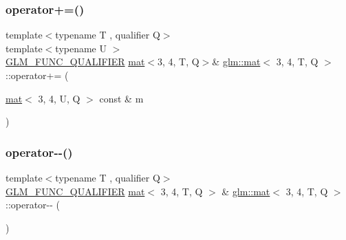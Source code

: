 \mbox{\label{structglm_1_1mat_3_013_00_014_00_01_t_00_01_q_01_4_a34254ab9a3f60274b681b3a1c0a3bf67}} 
\subsubsection{\texorpdfstring{operator+=()}{operator+=()}\hspace{0.1cm}{\footnotesize\ttfamily [4/4]}}
{\footnotesize\ttfamily template$<$typename T , qualifier Q$>$ \\
template$<$typename U $>$ \\
\mbox{\hyperlink{setup_8hpp_a33fdea6f91c5f834105f7415e2a64407}{G\+L\+M\+\_\+\+F\+U\+N\+C\+\_\+\+Q\+U\+A\+L\+I\+F\+I\+ER}} \mbox{\hyperlink{structglm_1_1mat}{mat}}$<$3, 4, T, Q$>$\& \mbox{\hyperlink{structglm_1_1mat}{glm\+::mat}}$<$ 3, 4, T, Q $>$\+::operator+= (\begin{DoxyParamCaption}\item[{\mbox{\hyperlink{structglm_1_1mat}{mat}}$<$ 3, 4, U, Q $>$ const \&}]{m }\end{DoxyParamCaption})}

\mbox{\label{structglm_1_1mat_3_013_00_014_00_01_t_00_01_q_01_4_a127c5f4434bbd959b577ae5dfd808c10}} 
\subsubsection{\texorpdfstring{operator-\/-\/()}{operator--()}\hspace{0.1cm}{\footnotesize\ttfamily [1/2]}}
{\footnotesize\ttfamily template$<$typename T , qualifier Q$>$ \\
\mbox{\hyperlink{setup_8hpp_a33fdea6f91c5f834105f7415e2a64407}{G\+L\+M\+\_\+\+F\+U\+N\+C\+\_\+\+Q\+U\+A\+L\+I\+F\+I\+ER}} \mbox{\hyperlink{structglm_1_1mat}{mat}}$<$ 3, 4, T, Q $>$ \& \mbox{\hyperlink{structglm_1_1mat}{glm\+::mat}}$<$ 3, 4, T, Q $>$\+::operator-\/-\/ (\begin{DoxyParamCaption}{ }\end{DoxyParamCaption})}


